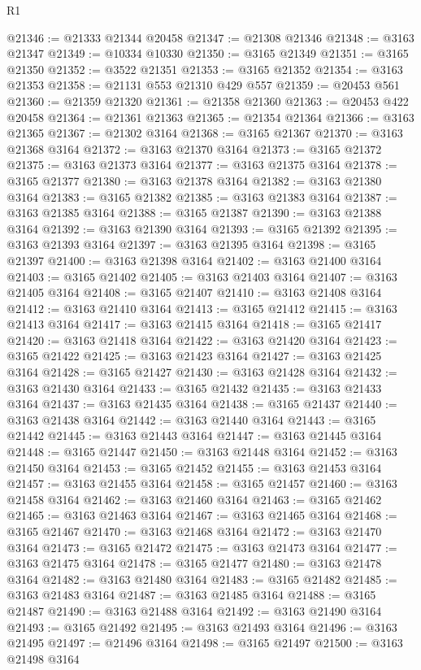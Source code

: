\begin{lexlean}{R1}
\begin{coremodule}
@21346 := @21333 @21344 @20458
@21347 := @21308 @21346
@21348 := @3163 @21347
@21349 := @10334 @10330
@21350 := @3165 @21349
@21351 := @3165 @21350
@21352 := @3522 @21351
@21353 := @3165 @21352
@21354 := @3163 @21353
@21358 := @21131 @553 @21310 @429 @557
@21359 := @20453 @561
@21360 := @21359 @21320
@21361 := @21358 @21360
@21363 := @20453 @422 @20458
@21364 := @21361 @21363
@21365 := @21354 @21364
@21366 := @3163 @21365
@21367 := @21302 @3164
@21368 := @3165 @21367
@21370 := @3163 @21368 @3164
@21372 := @3163 @21370 @3164
@21373 := @3165 @21372
@21375 := @3163 @21373 @3164
@21377 := @3163 @21375 @3164
@21378 := @3165 @21377
@21380 := @3163 @21378 @3164
@21382 := @3163 @21380 @3164
@21383 := @3165 @21382
@21385 := @3163 @21383 @3164
@21387 := @3163 @21385 @3164
@21388 := @3165 @21387
@21390 := @3163 @21388 @3164
@21392 := @3163 @21390 @3164
@21393 := @3165 @21392
@21395 := @3163 @21393 @3164
@21397 := @3163 @21395 @3164
@21398 := @3165 @21397
@21400 := @3163 @21398 @3164
@21402 := @3163 @21400 @3164
@21403 := @3165 @21402
@21405 := @3163 @21403 @3164
@21407 := @3163 @21405 @3164
@21408 := @3165 @21407
@21410 := @3163 @21408 @3164
@21412 := @3163 @21410 @3164
@21413 := @3165 @21412
@21415 := @3163 @21413 @3164
@21417 := @3163 @21415 @3164
@21418 := @3165 @21417
@21420 := @3163 @21418 @3164
@21422 := @3163 @21420 @3164
@21423 := @3165 @21422
@21425 := @3163 @21423 @3164
@21427 := @3163 @21425 @3164
@21428 := @3165 @21427
@21430 := @3163 @21428 @3164
@21432 := @3163 @21430 @3164
@21433 := @3165 @21432
@21435 := @3163 @21433 @3164
@21437 := @3163 @21435 @3164
@21438 := @3165 @21437
@21440 := @3163 @21438 @3164
@21442 := @3163 @21440 @3164
@21443 := @3165 @21442
@21445 := @3163 @21443 @3164
@21447 := @3163 @21445 @3164
@21448 := @3165 @21447
@21450 := @3163 @21448 @3164
@21452 := @3163 @21450 @3164
@21453 := @3165 @21452
@21455 := @3163 @21453 @3164
@21457 := @3163 @21455 @3164
@21458 := @3165 @21457
@21460 := @3163 @21458 @3164
@21462 := @3163 @21460 @3164
@21463 := @3165 @21462
@21465 := @3163 @21463 @3164
@21467 := @3163 @21465 @3164
@21468 := @3165 @21467
@21470 := @3163 @21468 @3164
@21472 := @3163 @21470 @3164
@21473 := @3165 @21472
@21475 := @3163 @21473 @3164
@21477 := @3163 @21475 @3164
@21478 := @3165 @21477
@21480 := @3163 @21478 @3164
@21482 := @3163 @21480 @3164
@21483 := @3165 @21482
@21485 := @3163 @21483 @3164
@21487 := @3163 @21485 @3164
@21488 := @3165 @21487
@21490 := @3163 @21488 @3164
@21492 := @3163 @21490 @3164
@21493 := @3165 @21492
@21495 := @3163 @21493 @3164
@21496 := @3163 @21495
@21497 := @21496 @3164
@21498 := @3165 @21497
@21500 := @3163 @21498 @3164

\end{coremodule}
\end{lexlean}
